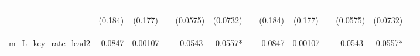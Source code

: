 \documentclass[]{article}
\begin{document}
\begin{center}
\begin{tabular}{lcccccccccccc}
\vspace{4pt} & \begin{footnotesize}(0.184)\end{footnotesize} & \begin{footnotesize}(0.177)\end{footnotesize} & \begin{footnotesize}\end{footnotesize} & \begin{footnotesize}(0.0575)\end{footnotesize} & \begin{footnotesize}(0.0732)\end{footnotesize} & \begin{footnotesize}\end{footnotesize} & \begin{footnotesize}(0.184)\end{footnotesize} & \begin{footnotesize}(0.177)\end{footnotesize} & \begin{footnotesize}\end{footnotesize} & \begin{footnotesize}(0.0575)\end{footnotesize} & \begin{footnotesize}(0.0732)\end{footnotesize} & \begin{footnotesize}\end{footnotesize} \\
m\_L\_key\_rate\_lead2 & -0.0847 & 0.00107 &  & -0.0543 & -0.0557* &  & -0.0847 & 0.00107 &  & -0.0543 & -0.0557* &  \\

\end{tabular}
\end{center}
\end{document}
